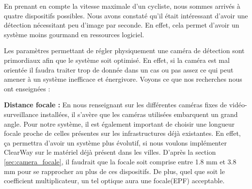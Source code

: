 En prenant en compte la vitesse maximale d'un cycliste, nous sommes arrivés à quatre dispositifs possibles. Nous avons constaté qu'il était intéressant
d'avoir une détection nécessitant peu d'image par seconde. En effet, cela permet d'avoir un système moins gourmand en ressources logiciel.

Les paramètres permettant de régler physiquement une caméra de détection sont primordiaux afin que le système soit optimisé. 
En effet, si la caméra est mal orientée il faudra traiter trop de donnée dans un cas ou pas assez ce qui peut amener à un système inefficace et énergivore.
Voyons ce que nos recherches nous ont enseignées :
\newline \newline

\textbf{Distance focale :}
\newline
En nous renseignant sur les différentes caméras fixes de vidéo-surveillance installées, il s’avère que les caméras utilisées embarquent un grand angle.
Pour notre système, il est également important de choisir une longueur focale proche de celles présentes sur les infrastructures déjà existantes. 
En effet, ça permettra d'avoir un système plus évolutif, si nous voulons implémenter ClearWay sur le matériel déjà présent dans les villes.
D'après la section \ref{sec:camera_focale}, il faudrait que la focale soit comprise entre 1.8 mm et 3.8 mm pour se rapprocher au plus de ces dispositifs.
De plus, quel que soit le coefficient multiplicateur, un tel optique aura une focale(EPF) acceptable.
\newline \newline

